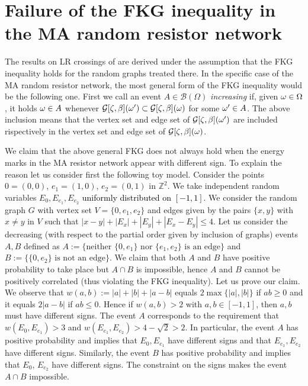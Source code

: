 \documentclass[12pt,a4paper,reqno]{amsart}
\newcommand{\cB}{\ensuremath{\mathcal B}}
\newcommand{\cG}{\ensuremath{\mathcal G}}
\newcommand{\bbZ}{{\ensuremath{\mathbb Z}} }
\let\O=\Omega \let\P=\Pi   \let\Ps=\Psi \let\Si=\Sigma \let\X=\Xi
\newcommand{\orc}{\textcolor{black}} %
\begin{document}
 \section{Failure of the FKG inequality in the MA random resistor network}\label{app_FKG}
The  results on LR crossings  of \cite{FagMim2}  are derived under the assumption that the FKG inequality holds for the random graphs treated there. In the specific case of the MA random resistor network, 
the most general form of the FKG inequality   would be the following one. 
First we call an event $A\in \cB(\O)$  \emph{increasing} if, given $\o\in \O$, it holds  $\omega\in A$  whenever $\cG[ \z, \b](\o')\subset \cG[\z,\b](\o)$  for some $\omega'\in A$. The above inclusion means that the vertex set and edge  set of  $\cG[ \z, \b](\o')$ are included rispectively in the 
 vertex set and edge  set of  $\cG[ \z, \b](\o)$.


 
 
 We claim that  the  above general FKG does not always hold when  the energy marks in the MA resistor network appear with different sign. To explain the reason let us consider first  the following toy model. Consider the points  $0=(0,0)$, $e_1=(1,0)$, $e_2=(0,1)$ in $\bbZ^2$. We take   independent random variables  $E_0,E_{e_1},E_{e_2}$  \orc{uniformly distributed on $[-1,1]$}. We consider the random graph $  G$ with vertex set  $ V=\{0,e_1,e_2\}$ and edges  given by the pairs $\{x,y\}$ with $x\not =y $ in $ V$ 
such that  $|x-y|+|E_x|+|E_y|+|E_x-E_y| \leq 4$.
Let us consider the decreasing (with respect to the partial order given by inclusion of graphs)  events  $A,B$ defined as $A:=\big\{ \text{neither } \{0,e_1\} \text{ nor } \{e_1,e_2\} \text{ is  an edge} \big\}$ and $B:=\big \{ \{0,e_2\}  \text{ is not an  edge}\big\}$. We claim that both $A$ and $B$ have positive probability to take place but  $A\cap B$ is impossible, hence $A$ and $B$ cannot be positively correlated (thus violating the FKG inequality). Let us prove our claim.  We observe that   $w(a,b):=|a|+|b|+|a-b|$ equals $2 \max\{|a|,|b|\}$ if $ab\geq 0$ and it equals  $2 |a-b|$ if $ab \leq 0$. Hence if $w(a,b)>2$
 with $a,b\in [-1,1]$, then $a,b$ must have different signs.
 The event $A$ corresponds to the requirement that   $ w(E_0,E_{e_1})>3$ and  $ w(E_{e_1}, E_{e_2})>4-\sqrt{2}>2$. In particular, the event  $A$ has positive probability and  implies that $E_0, E_{e_1}$ have different signs and that  $E_{e_1}, E_{e_2}$ have different signs. 
Similarly, the event  $B$ has positive probability and implies that  $E_0$, $E_{e_2}$  have different signs. The constraint on the signs makes the event $A\cap B$ impossible.
\end{document}
